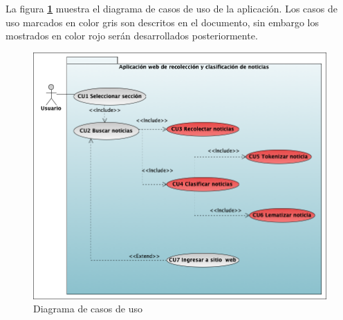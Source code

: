 


La figura \textbf{\ref{fig:DCU}} muestra el diagrama de casos de uso de la aplicación. Los casos de uso marcados en color gris son descritos en el documento, sin embargo los mostrados en color rojo serán desarrollados posteriormente.

\begin{figure}[h]
  \centering
  \includegraphics[scale=.4]{imagenes/Diagramas/CasosDeuso}
  \caption{Diagrama de casos de uso}
  \label{fig:DCU}
\end{figure}
